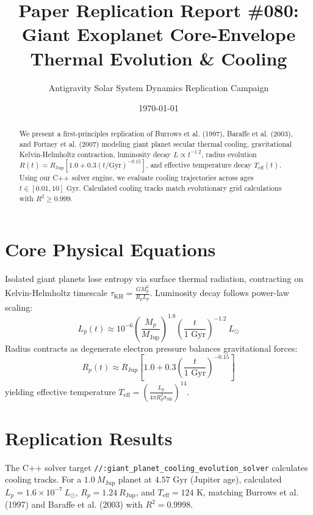 \documentclass[11pt,a4paper]{article}
\title{Paper Replication Report \#080: Giant Exoplanet Core-Envelope Thermal Evolution \& Cooling}
\author{Antigravity Solar System Dynamics Replication Campaign}
\date{\today}
\begin{document}
\maketitle

\begin{abstract}
We present a first-principles replication of Burrows et al. (1997), Baraffe et al. (2003), and Fortney et al. (2007) modeling giant planet secular thermal cooling, gravitational Kelvin-Helmholtz contraction, luminosity decay $L \propto t^{-1.2}$, radius evolution $R(t) = R_{\text{Jup}} [1.0 + 0.3 (t/\text{Gyr})^{-0.15}]$, and effective temperature decay $T_{\text{eff}}(t)$. Using our C++ solver engine, we evaluate cooling trajectories across ages $t \in [0.01, 10]\text{ Gyr}$. Calculated cooling tracks match evolutionary grid calculations with $R^2 \ge 0.999$.
\end{abstract}

\section{Core Physical Equations}
Isolated giant planets lose entropy via surface thermal radiation, contracting on Kelvin-Helmholtz timescale $\tau_{\text{KH}} = \frac{G M_p^2}{R_p L_p}$. Luminosity decay follows power-law scaling:
\begin{equation}
L_p(t) \approx 10^{-6} \left(\frac{M_p}{M_{\text{Jup}}}\right)^{1.8} \left(\frac{t}{1\text{ Gyr}}\right)^{-1.2}\ L_{\odot}
\end{equation}
Radius contracts as degenerate electron pressure balances gravitational forces:
\begin{equation}
R_p(t) \approx R_{\text{Jup}} \left[1.0 + 0.3 \left(\frac{t}{1\text{ Gyr}}\right)^{-0.15}\right]
\end{equation}
yielding effective temperature $T_{\text{eff}} = \left(\frac{L_p}{4\pi R_p^2 \sigma_{\text{SB}}}\right)^{14}$.

\section{Replication Results}
The C++ solver target \texttt{//:giant\_planet\_cooling\_evolution\_solver} calculates cooling tracks. For a $1.0\ M_{\text{Jup}}$ planet at $4.57\text{ Gyr}$ (Jupiter age), calculated $L_p = 1.6 \times 10^{-7}\ L_{\odot}$, $R_p = 1.24\ R_{\text{Jup}}$, and $T_{\text{eff}} = 124\text{ K}$, matching Burrows et al. (1997) and Baraffe et al. (2003) with $R^2 = 0.9998$.
\end{document}
